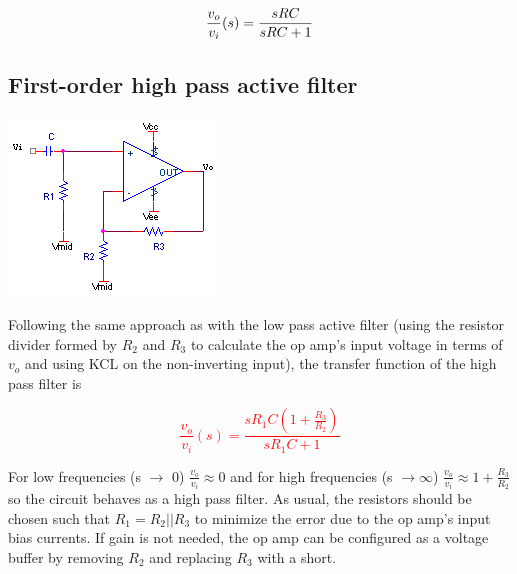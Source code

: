 \textcolor{red}{
\begin{equation}
\frac{v_o}{v_i}(s) = \frac{sRC}{sRC+1}
\label{eq:rcHPfilter}
\end{equation}
}

\subsection{First-order high pass active filter}
\begin{center}
	\includegraphics{schematics/1storderHPfilter.PNG}
\end{center}
Following the same approach as with the low pass active filter (using the resistor divider formed by $R_{2}$ and $R_{3}$ to calculate the op amp's input voltage in terms of $v_{o}$ and using KCL on the non-inverting input), the transfer function of the high pass filter is

\textcolor{red}{
\begin{equation}\frac{v_{o}}{v_{i}}(s) = \frac{sR_{1}C(1+\frac{R_{3}}{R_{2}})}{sR_{1}C+1}
\label{eq:1storderHPfilter}
\end{equation}
}

For low frequencies (s $\rightarrow$ 0) $\frac{v_{o}}{v_{i}} \approx 0$ and for high frequencies (s $\rightarrow \infty$) $\frac{v_{o}}{v_{i}} \approx 1 + \frac{R_{3}}{R_{2}}$ so the circuit behaves as a high pass filter. As usual, the resistors should be chosen such that $R_{1} = R_{2}||R_{3}$ to minimize the error due to the op amp's input bias currents. If gain is not needed, the op amp can be configured as a voltage buffer by removing $R_{2}$ and replacing $R_{3}$ with a short.

